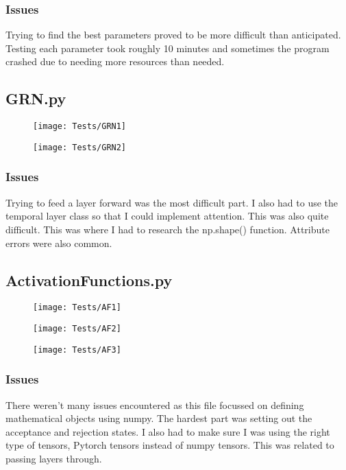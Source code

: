 \documentclass{article}
\begin{document}
\subsubsection{Issues}
Trying to find the best parameters proved to be more difficult than anticipated.
Testing each parameter took roughly 10 minutes and sometimes the program crashed
due to needing more resources than needed.

\subsection{GRN.py}

\begin{figure}[H]
    \centering
    \texttt{[image: Tests/GRN1]}
\end{figure}

\begin{figure}[H]
    \centering
    \texttt{[image: Tests/GRN2]}
\end{figure}

\subsubsection{Issues}
Trying to feed a layer forward was the most difficult part. I also had to use
the temporal layer class so that I could implement attention. This was also
quite difficult. This was where I had to research the
np.shape() function. Attribute errors were also common.

\subsection{ActivationFunctions.py}

\begin{figure}[H]
    \centering
    \texttt{[image: Tests/AF1]}
\end{figure}

\begin{figure}[H]
    \centering
    \texttt{[image: Tests/AF2]}
\end{figure}

\begin{figure}[H]
    \centering
    \texttt{[image: Tests/AF3]}
\end{figure}

\subsubsection{Issues}
There weren't many issues encountered as this file focussed on defining
mathematical objects using numpy. The hardest part was setting out the acceptance
and rejection states. I also had to make sure I was using the right type of tensors,
Pytorch tensors instead of numpy tensors. This was related to passing layers through.
\end{document}
